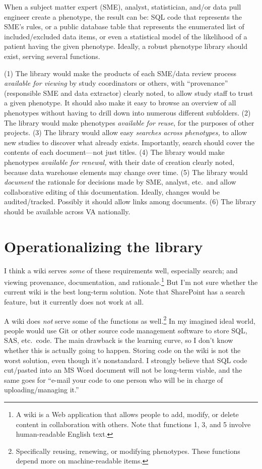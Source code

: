 \documentclass{tufte-handout}
\begin{document}
When a subject matter expert (SME), analyst, statistician, and/or data
pull engineer create a phenotype, the result can be: SQL code that
represents the SME's rules, or a public database table that represents
the enumerated list of included/excluded data items, or even a
statistical model of the likelihood of a patient having the given
phenotype. Ideally, a robust phenotype library should exist, serving
several functions.

(1) The library would make the products of each SME/data review
process \emph{available for viewing} by study coordinators or others,
with ``provenance'' (responsible SME and data extractor) clearly
noted, to allow study staff to trust a given phenotype. It should also
make it easy to browse an overview of all phenotypes without having to
drill down into numerous different subfolders. (2) The library would
make phenotypes \emph{available for reuse}, for the purposes of other
projects. (3) The library would allow easy \emph{searches across
  phenotypes,} to allow new studies to discover what already exists.
Importantly, search should cover the contents of each document---not
just titles. (4) The library would make phenotypes \emph{available for
  renewal,} with their date of creation clearly noted, because data
warehouse elements may change over time. (5) The library would
\emph{document} the rationale for decisions made by SME, analyst,
etc.\ and allow collaborative editing of this documentation. Ideally,
changes would be audited/tracked. Possibly it should allow links among
documents. (6) The library should be available across VA nationally.

\section{Operationalizing the library}

I think a wiki serves \emph{some} of these requirements well,
especially search; and viewing provenance, documentation, and
rationale.\footnote{A wiki is a Web application that allows people to
  add, modify, or delete content in collaboration with others. Note
  that functions 1, 3, and 5 involve human-readable English text.} But
I'm not sure whether the current wiki is the best long-term solution.
Note that SharePoint has a search feature, but it currently does not
work at all.

A wiki does \emph{not} serve some of the functions as
well.\footnote{Specifically reusing, renewing, or modifying
  phenotypes. These functions depend more on machine-readable items.}
In my imagined ideal world, people would use Git or other source code
management software to store SQL, SAS, etc.\ code. The main drawback
is the learning curve, so I don't know whether this is actually going
to happen. Storing code on the wiki is not the worst solution, even
though it's nonstandard. I strongly believe that SQL code cut/pasted
into an MS Word document will not be long-term viable, and the same
goes for ``e-mail your code to one person who will be in charge of
uploading/managing it.''
\end{document}
